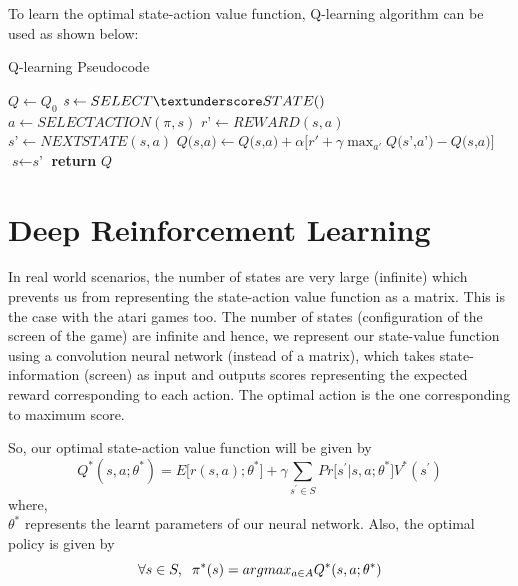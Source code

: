 \documentclass[conference]{IEEEtran}
\begin{document}
To learn the optimal state-action value function, Q-learning algorithm can be used as shown below:
\begin{algorithm}
\caption{Q-learning Pseudocode \cite{fml}}\label{qlearn}
\begin{algorithmic}[1]
 \scriptsize
{}
    \State $\textit{Q} \gets \textit{Q}_{0} $ 
        \State $\textit{s} \gets SELECT \textunderscore STATE()$
            \State $\textit{a} \gets SELECTACTION(\pi,s)$ 
            \State $\textit{r'} \gets REWARD(s,a)$
            \State $\textit{s'} \gets NEXTSTATE(s,a)$
            \State $\textit{Q(s,a)} \gets  \textit{Q(s,a)} + \alpha \big[ r' + \gamma \max_{a'} \textit{Q(s',a')} - \textit{Q(s,a)} \big]$
            \State $\textit{s} \gets \textit{s'}$
        \EndFor 
    \EndFor
    \State \textbf{return} $\textit{Q}$
\EndProcedure
\end{algorithmic}
\end{algorithm}

\section{Deep Reinforcement Learning}
In real world scenarios, the number of states are very large (infinite) which prevents us from representing the state-action value function as a matrix. This is the case with the atari games too. The number of states (configuration of the screen of the game) are infinite and hence, we represent our state-value function using a convolution neural network (instead of a matrix), which takes state-information (screen) as input and outputs scores representing the expected reward corresponding to each action. The optimal action is the one corresponding to maximum score.

So, our optimal state-action value function will be given by
\begin{equation} \label{eq:optStateActionValue}
Q^{*}(s,a;\theta^{*}) = E\big[ r(s,a);\theta^{*} \big] + \gamma \sum_{s^{'} \in S} Pr\big[ s^{'} | s, a;\theta^{*} \big] V^{*}(s^{'})
\end{equation}
where,\\
$\theta^{*}$ represents the learnt parameters of our neural network. Also, the optimal policy is given by 
\begin{equation} \label{eq:optimalPolicyDeep}
\forall s \in S,\hspace{0.2cm} \pi^{*}(s) = argmax_{a\in A} Q^{*}(s,a;\theta^{*})
\end{equation}
\end{document}
